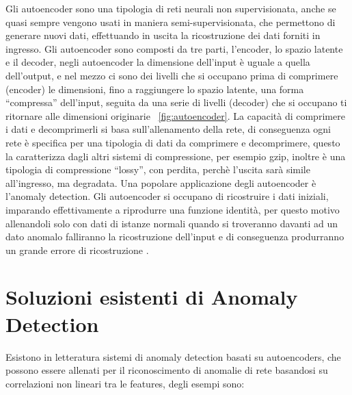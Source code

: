 
Gli autoencoder sono una tipologia di reti neurali non supervisionata, anche se quasi sempre vengono usati in maniera semi-supervisionata, che permettono di generare nuovi dati, effettuando in uscita la ricostruzione dei dati forniti in ingresso.
Gli autoencoder sono composti da tre parti, l'encoder, lo spazio latente e il decoder, negli autoencoder la dimensione dell'input è uguale a quella dell'output, e nel mezzo ci sono dei livelli che si occupano prima di comprimere (encoder) le dimensioni, fino a raggiungere lo spazio latente, una forma ``compressa'' dell'input, seguita da una serie di livelli (decoder) che si occupano ti ritornare alle dimensioni originarie ~\ref{fig:autoencoder}.
La capacità di comprimere i dati e decomprimerli si basa sull'allenamento della rete, di conseguenza ogni rete è specifica per una tipologia di dati da comprimere e decomprimere, questo la caratterizza dagli altri sistemi di compressione, per esempio gzip, inoltre è una tipologia di compressione ``lossy'', con perdita, perchè l'uscita sarà simile all'ingresso, ma degradata.
Una popolare applicazione degli autoencoder è l'anomaly detection. Gli autoencoder si occupano di ricostruire i dati iniziali, imparando effettivamente a riprodurre una funzione identità, per questo motivo allenandoli solo con dati di istanze normali quando si troveranno davanti ad un dato anomalo falliranno la ricostruzione dell'input e di conseguenza produrranno un grande errore di ricostruzione \cite{anomaly_detection_survey_2_deep_learning}. 


\section{Soluzioni esistenti di Anomaly Detection}

Esistono in letteratura sistemi di anomaly detection basati su autoencoders, che possono essere allenati per il riconoscimento di anomalie di rete basandosi su correlazioni non lineari tra le features, degli esempi sono:

